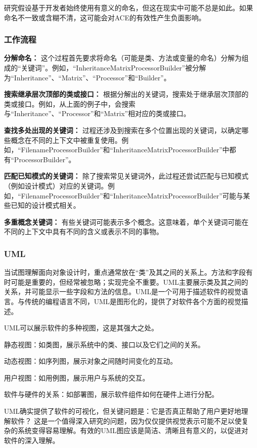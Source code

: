研究假设基于开发者始终使用有意义的命名，但这在现实中可能不总是如此。如果命名不一致或含糊不清，这可能会对ACE的有效性产生负面影响。

\subsubsection{工作流程}

\textbf{分解命名：}
这个过程首先要求将命名（可能是类、方法或变量的命名）分解为组成的“关键词”。例如，“InheritanceMatrixProcessorBuilder”被分解为“Inheritance”、“Matrix”、“Processor”和“Builder”。

\textbf{搜索继承层次顶部的类或接口：}
根据分解出的关键词，搜索处于继承层次顶部的类或接口。例如，从上面的例子中，会搜索与“Inheritance”、“Processor”和“Matrix”相对应的类或接口。

\textbf{查找多处出现的关键词：}
过程还涉及到搜索在多个位置出现的关键词，以确定哪些概念在不同的上下文中被重复使用。例如，“FilenameProcessorBuilder”和“InheritanceMatrixProcessorBuilder”中都有“ProcessorBuilder”。

\textbf{匹配已知模式的关键词：}
除了搜索常见关键词外，此过程还尝试匹配与已知模式（例如设计模式）对应的关键词。例如，“FilenameProcessorBuilder”和“InheritanceMatrixProcessorBuilder”可能与某些已知的设计模式相关。

\textbf{多重概念关键词：}
有些关键词可能表示多个概念。这意味着，单个关键词可能在不同的上下文中具有不同的含义或表示不同的事物。

\subsubsection{UML}

当试图理解面向对象设计时，重点通常放在“类”及其之间的关系上。方法和字段有时可能是重要的，但经常被忽略；实现完全不重要。UML主要展示类及其之间的关系，并可能显示一些字段和方法的信息。UML是一个可用于描述软件的视觉语言。与传统的编程语言不同，UML是图形化的，提供了对软件各个方面的视觉描述。

UML可以展示软件的多种视图，这是其强大之处。

静态视图：如类图，展示系统中的类、接口以及它们之间的关系。

动态视图：如序列图，展示对象之间随时间变化的互动。

用户视图：如用例图，展示用户与系统的交互。

软件与硬件的关系：如部署图，展示软件组件如何在硬件上进行分配。

UML确实提供了软件的可视化，但关键问题是：它是否真正帮助了用户更好地理解软件？
这是一个值得深入研究的问题，因为仅仅提供视觉表示可能不足以使复杂的系统变得容易理解。有效的UML图应该是简洁、清晰且有意义的，以促进对软件的深入理解。

